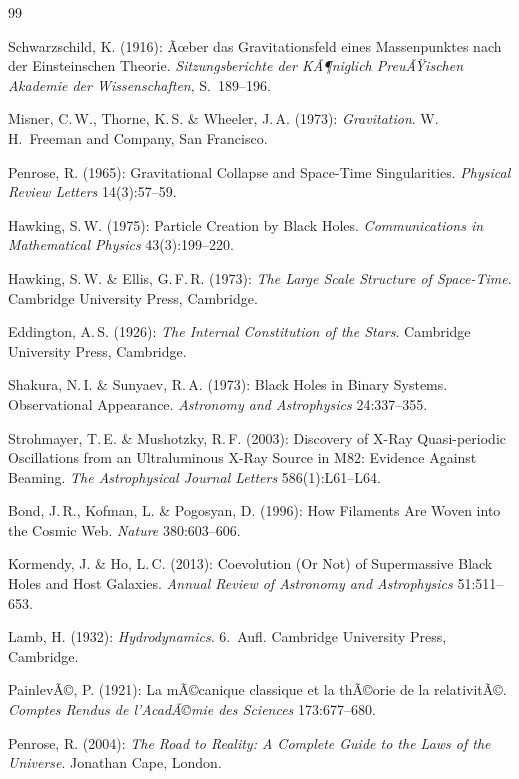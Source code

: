 ﻿\documentclass[12pt,a4paper]{report}
\begin{document}
\begin{thebibliography}{99}

Schwarzschild, K. (1916): Ãœber das Gravitationsfeld eines Massenpunktes nach der Einsteinschen Theorie. \textit{Sitzungsberichte der KÃ¶niglich PreuÃŸischen Akademie der Wissenschaften}, S.\ 189--196.

Misner, C.\,W., Thorne, K.\,S. \& Wheeler, J.\,A. (1973): \textit{Gravitation}. W.\,H.\ Freeman and Company, San Francisco.

Penrose, R. (1965): Gravitational Collapse and Space-Time Singularities. \textit{Physical Review Letters} 14(3):57--59.

Hawking, S.\,W. (1975): Particle Creation by Black Holes. \textit{Communications in Mathematical Physics} 43(3):199--220.

Hawking, S.\,W. \& Ellis, G.\,F.\,R. (1973): \textit{The Large Scale Structure of Space-Time}. Cambridge University Press, Cambridge.

Eddington, A.\,S. (1926): \textit{The Internal Constitution of the Stars}. Cambridge University Press, Cambridge.

Shakura, N.\,I. \& Sunyaev, R.\,A. (1973): Black Holes in Binary Systems. Observational Appearance. \textit{Astronomy and Astrophysics} 24:337--355.

Strohmayer, T.\,E. \& Mushotzky, R.\,F. (2003): Discovery of X-Ray Quasi-periodic Oscillations from an Ultraluminous X-Ray Source in M82: Evidence Against Beaming. \textit{The Astrophysical Journal Letters} 586(1):L61--L64.

Bond, J.\,R., Kofman, L. \& Pogosyan, D. (1996): How Filaments Are Woven into the Cosmic Web. \textit{Nature} 380:603--606.

Kormendy, J. \& Ho, L.\,C. (2013): Coevolution (Or Not) of Supermassive Black Holes and Host Galaxies. \textit{Annual Review of Astronomy and Astrophysics} 51:511--653.

Lamb, H. (1932): \textit{Hydrodynamics}. 6.\ Aufl. Cambridge University Press, Cambridge.

PainlevÃ©, P. (1921): La mÃ©canique classique et la thÃ©orie de la relativitÃ©. \textit{Comptes Rendus de l'AcadÃ©mie des Sciences} 173:677--680.

Penrose, R. (2004): \textit{The Road to Reality: A Complete Guide to the Laws of the Universe}. Jonathan Cape, London.


\end{thebibliography}
\end{document}
